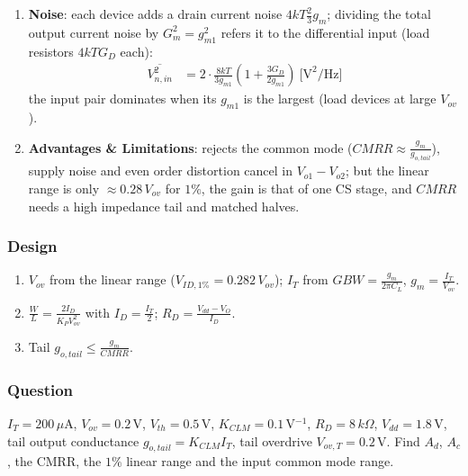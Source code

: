 \begin{enumerate}
  \item \textbf{Noise}: each device adds a drain current noise \(4kT\frac{2}{3}g_m\); dividing the total output
    current noise by \(G_m^2 = g_{m1}^2\) refers it to the differential input (load resistors \(4kTG_D\) each):
    \begin{align*}
      \overline{V_{n,in}^2} &= 2\cdot\frac{8kT}{3 g_{m1}}\left(1 + \frac{3 G_D}{2 g_{m1}}\right) \ \text{[V}^2\text{/Hz]}
    \end{align*}
    the input pair dominates when its \(g_{m1}\) is the largest (load devices at large \(V_{ov}\)).
  \item \textbf{Advantages \& Limitations}: rejects the common mode (\(CMRR \approx \frac{g_m}{g_{o,tail}}\)),
    supply noise and even order distortion cancel in \(V_{o1} - V_{o2}\); but the linear range is
    only \(\approx 0.28\,V_{ov}\) for \(1\%\), the gain is that of one CS stage, and \(CMRR\) needs a
    high impedance tail and matched halves.
\end{enumerate}

\subsubsection{Design}
\begin{enumerate}
  \item \(V_{ov}\) from the linear range (\(V_{ID,1\%} = 0.282\,V_{ov}\)); \(I_T\) from \(GBW = \frac{g_m}{2\pi C_L}\),
    \(g_m = \frac{I_T}{V_{ov}}\).
  \item \(\frac{W}{L} = \frac{2 I_D}{K_P V_{ov}^2}\) with \(I_D = \frac{I_T}{2}\); \(R_D = \frac{V_{dd} - V_{O}}{I_D}\).
  \item Tail \(g_{o,tail} \leq \frac{g_m}{CMRR}\).
\end{enumerate}

\subsubsection{Question}
\(I_T = 200\,\mu\)A, \(V_{ov} = 0.2\,\)V, \(V_{th} = 0.5\,\)V, \(K_{CLM} = 0.1\,\)V\(^{-1}\),
\(R_D = 8\,k\Omega\), \(V_{dd} = 1.8\,\)V, tail output conductance
\(g_{o,tail} = K_{CLM} I_T\), tail overdrive \(V_{ov,T} = 0.2\,\)V. Find \(A_d\),
\(A_c\), the CMRR, the \(1\%\) linear range and the input common mode range.
